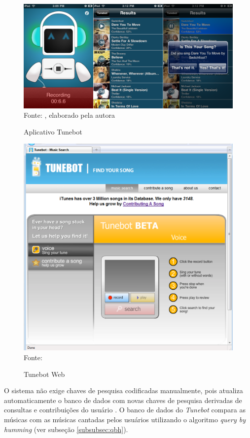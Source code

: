 \begin{figure}[!htb]
   \centering
   \caption{Aplicativo Tunebot}\label{fig:tunebotIphone} 
   \includegraphics[scale=0.35]{figuras/tunebot-iphone.png}
   \\Fonte: \cite{tunebotiOS}, elaborado pela autora
\end{figure}

\begin{figure}[!htb]
   \centering
   \caption{Tunebot Web}\label{fig:tunebotWeb} 
   \includegraphics[scale=0.60]{figuras/tunebotWeb.png}
   \\Fonte: \cite{pardo2010}
\end{figure}

O sistema não exige chaves de pesquisa codificadas manualmente, pois atualiza automaticamente o banco de dados com novas chaves de pesquisa derivadas de consultas e contribuições do usuário \cite{pardo2010}. O banco de dados do \textit{Tunebot} compara as músicas com as músicas cantadas pelos usuários utilizando o algoritmo \textit{query by humming} (ver subseção \ref{subsubsec:qbh}).

